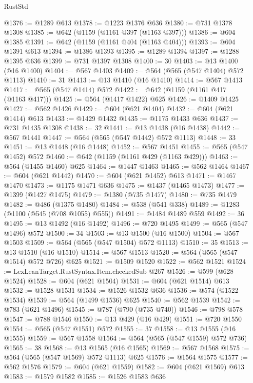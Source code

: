 \begin{lexlean}{RustStd}
\begin{coremodule}
@1376 := @1289 @613
@1378 := @1223 @1376 @636
@1380 := @731 @1378 @1308
@1385 := @642 (@1159 (@1161 @397 (@1163 @397)))
@1386 := @604 @1385
@1391 := @642 (@1159 (@1161 @404 (@1163 @404)))
@1393 := @604 @1391 @613
@1394 := @1386 @1393
@1395 := @1289 @1394
@1397 := @1288 @1395 @636
@1399 := @731 @1397 @1308
@1400 := 30
@1403 := @13 @1400 (@16 @1400)
@1404 := @567 @1403
@1409 := @564 (@565 (@547 @1404) @572 @1113)
@1410 := 31
@1413 := @13 @1410 (@16 @1410)
@1414 := @567 @1413
@1417 := @565 (@547 @1414) @572
@1422 := @642 (@1159 (@1161 @417 (@1163 @417)))
@1425 := @564 (@1417 @1422) @625
@1426 := @1409 @1425
@1427 := @562 @1426
@1429 := @604 (@621 @1404)
@1432 := @604 (@621 @1414) @613
@1433 := @1429 @1432
@1435 := @1175 @1433 @636
@1437 := @731 @1435 @1308
@1438 := 32
@1441 := @13 @1438 (@16 @1438)
@1442 := @567 @1441
@1447 := @564 (@565 (@547 @1442) @572 @1113)
@1448 := 33
@1451 := @13 @1448 (@16 @1448)
@1452 := @567 @1451
@1455 := @565 (@547 @1452) @572
@1460 := @642 (@1159 (@1161 @429 (@1163 @429)))
@1463 := @564 (@1455 @1460) @625
@1464 := @1447 @1463
@1465 := @562 @1464
@1467 := @604 (@621 @1442)
@1470 := @604 (@621 @1452) @613
@1471 := @1467 @1470
@1473 := @1175 @1471 @636
@1475 := @1437 (@1465 @1473)
@1477 := @1399 (@1427 @1475)
@1479 := @1380 (@735 @1477)
@1480 := @735 @1479
@1482 := @486 (@1375 @1480)
@1484 := @538 (@541 @338)
@1489 := @1283 (@1100 (@545 (@708 @1055) @555))
@1491 := @1484 @1489 @559
@1492 := 36
@1495 := @13 @1492 (@16 @1492)
@1496 := @720 @1495
@1499 := @565 (@547 @1496) @572
@1500 := 34
@1503 := @13 @1500 (@16 @1500)
@1504 := @567 @1503
@1509 := @564 (@565 (@547 @1504) @572 @1113)
@1510 := 35
@1513 := @13 @1510 (@16 @1510)
@1514 := @567 @1513
@1520 := @564 (@565 (@547 @1514) @572 @726) @625
@1521 := @1509 @1520
@1522 := @562 @1521
@1524 := LexLeanTarget.RustSyntax.Item.checkedSub @267
@1526 := @599 (@628 @1524)
@1528 := @604 (@621 @1504)
@1531 := @604 (@621 @1514) @613
@1532 := @1528 @1531
@1534 := @1526 @1532 @636
@1536 := @574 (@1522 @1534)
@1539 := @564 (@1499 @1536) @625
@1540 := @562 @1539
@1542 := @783 (@621 @1496)
@1545 := @787 (@790 (@735 @740))
@1546 := @798 @578
@1547 := @788 @1546
@1550 := @13 @429 (@16 @429)
@1551 := @720 @1550
@1554 := @565 (@547 @1551) @572
@1555 := 37
@1558 := @13 @1555 (@16 @1555)
@1559 := @567 @1558
@1564 := @564 (@565 (@547 @1559) @572 @736)
@1565 := 38
@1568 := @13 @1565 (@16 @1565)
@1569 := @567 @1568
@1575 := @564 (@565 (@547 @1569) @572 @1113) @625
@1576 := @1564 @1575
@1577 := @562 @1576
@1579 := @604 (@621 @1559)
@1582 := @604 (@621 @1569) @613
@1583 := @1579 @1582
@1585 := @1526 @1583 @636

\end{coremodule}
\end{lexlean}
